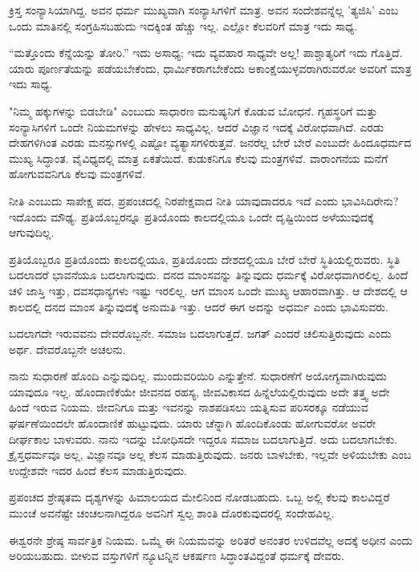 ಕ್ರಿಸ್ತ ಸಂನ್ಯಾಸಿಯಾಗಿದ್ದ. ಅವನ ಧರ್ಮ ಮುಖ್ಯವಾಗಿ ಸಂನ್ಯಾಸಿಗಳಿಗೆ ಮಾತ್ರ. ಅವನ ಸಂದೇಶವನ್ನೆಲ್ಲ 'ತ್ಯಜಿಸಿ' ಎಂಬ ಒಂದು ಮಾತಿನಲ್ಲಿ ಸಂಗ್ರಹಿಸಬಹುದು ಇದಕ್ಕಿಂತ ಹೆಚ್ಚು ಇಲ್ಲ. ಎಲ್ಲೋ ಕೆಲವರಿಗೆ ಮಾತ್ರ ಇದು ಸಾಧ್ಯ.

“ಮತ್ತೊಂದು ಕೆನ್ನೆಯನ್ನು ತೋರಿ.” ಇದು ಅಸಾಧ್ಯ; ಇದು ವ್ಯವಹಾರ ಸಾಧ್ಯವೇ ಅಲ್ಲ! ಪಾಶ್ಚಾತ್ಯರಿಗೆ ಇದು ಗೊತ್ತಿದೆ. ಯಾರು ಪೂರ್ಣತೆಯನ್ನು ಪಡೆಯಬೇಕೆಂದು, ಧಾರ್ಮಿಕರಾಗಬೇಕೆಂದು ಅಕಾಂಕ್ಷೆಯುಳ್ಳವರಾಗಿರುವರೋ ಅವರಿಗೆ ಮಾತ್ರ ಇದು ಸಾಧ್ಯ.

"ನಿಮ್ಮ ಹಕ್ಕುಗಳನ್ನು ಬಿಡಬೇಡಿ" ಎಂಬುದು ಸಾಧಾರಣ ಮನುಷ್ಯನಿಗೆ ಕೊಡುವ ಬೋಧನೆ. ಗೃಹಸ್ಥರಿಗೆ ಮತ್ತು ಸಂನ್ಯಾಸಿಗಳಿಗೆ ಒಂದೇ ನಿಯಮಗಳನ್ನು ಹೇಳಲು ಸಾಧ್ಯವಿಲ್ಲ. ಆದರೆ ವಿಜ್ಞಾನ ಇದಕ್ಕೆ ವಿರೋಧವಾಗಿದೆ. ಎರಡು ದೇಹಗಳಿಗಿಂತ ಎರಡು ಮನಸ್ಸುಗಳಲ್ಲಿ ಎಷ್ಟೋ ವ್ಯತ್ಯಾಸಗಳಿರುತ್ತವೆ. ಜನರೆಲ್ಲ ಬೇರೆ ಬೇರೆ ಎಂಬುದೇ ಹಿಂದೂಧರ್ಮದ ಮುಖ್ಯ ಸಿದ್ಧಾಂತ. ವೈವಿಧ್ಯದಲ್ಲಿ ಮಾತ್ರ ಏಕತೆಯಿದೆ. ಕುಡುಕನಿಗೂ ಕೆಲವು ಮಂತ್ರಗಳಿವೆ. ವಾರಾಂಗನೆಯ ಮನೆಗೆ ಹೋಗುವವನಿಗೂ ಕೆಲವು ಮಂತ್ರಗಳಿವೆ.

ನೀತಿ ಎಂಬುದು ಸಾಪೇಕ್ಷ ಪದ, ಪ್ರಪಂಚದಲ್ಲಿ ನಿರಪೇಕ್ಷವಾದ ನೀತಿ ಯಾವುದಾದರೂ ಇದೆ ಎಂದು ಭಾವಿಸಿದಿರೇನು? ಇದೊಂದು ಮೌಢ್ಯ. ಪ್ರತಿಯೊಬ್ಬರನ್ನೂ ಪ್ರತಿಯೊಂದು ಕಾಲದಲ್ಲಿಯೂ ಒಂದೇ ದೃಷ್ಟಿಯಿಂದ ಅಳೆಯುವುದಕ್ಕೆ ಆಗುವುದಿಲ್ಲ.

ಪ್ರತಿಯೊಬ್ಬರೂ ಪ್ರತಿಯೊಂದು ಕಾಲದಲ್ಲಿಯೂ, ಪ್ರತಿಯೊಂದು ದೇಶದಲ್ಲಿಯೂ ಬೇರೆ ಬೇರೆ ಸ್ಥಿತಿಯಲ್ಲಿರುವರು. ಸ್ಥಿತಿ ಬದಲಾದರೆ ಭಾವನೆಯೂ ಬದಲಾಗುವುದು. ದನದ ಮಾಂಸವನ್ನು ತಿನ್ನುವುದು ಧರ್ಮಕ್ಕೆ ವಿರೋಧವಾಗಿರಲಿಲ್ಲ. ಹಿಂದೆ ಚಳಿ ಜಾಸ್ತಿ ಇತ್ತು, ದವಸಧಾನ್ಯಗಳು ಇಷ್ಟು ಇರಲಿಲ್ಲ. ಆಗ ಮಾಂಸ ಒಂದೇ ಮುಖ್ಯ ಆಹಾರವಾಗಿತ್ತು. ಆ ದೇಶದಲ್ಲಿ ಆ ಕಾಲದಲ್ಲಿ ದನದ ಮಾಂಸ ತಿನ್ನುವುದಕ್ಕೆ ಅನುಮತಿ ಇತ್ತು. ಆದರೆ ಈಗ ಅದನ್ನು ಅಧರ್ಮ ಎಂದು ಭಾವಿಸುವರು.

ಬದಲಾಗದೇ ಇರುವವನು ದೇವರೊಬ್ಬನೇ. ಸಮಾಜ ಬದಲಾಗುತ್ತದೆ. ಜಗತ್ ಎಂದರೆ ಚಲಿಸುತ್ತಿರುವುದು ಎಂದು ಅರ್ಥ. ದೇವರೊಬ್ಬನೇ ಅಚಲನು.

ನಾನು ಸುಧಾರಣೆ ಹೊಂದಿ ಎನ್ನುವುದಿಲ್ಲ. ಮುಂದುವರಿಯಿರಿ ಎನ್ನುತ್ತೇನೆ. ಸುಧಾರಣೆಗೆ ಅಯೋಗ್ಯವಾಗಿರುವುದು ಯಾವುದೂ ಇಲ್ಲ. ಹೊಂದಾಣಿಕೆಯೇ ಜೀವನದ ರಹಸ್ಯ, ಜೀವವಿಕಾಸದ ಹಿನ್ನೆಲೆಯಲ್ಲಿರುವುದು ಅದೇ ತತ್ತ್ವ ಅದೇ ಹಿಂದೆ ಇರುವ ನಿಯಮ. ಜೀವನಿಗೂ ಮತ್ತು ಇವನನ್ನು ನಾಶಪಡಿಸಲು ಯತ್ನಿಸುವ ಪರಿಸರಕ್ಕೂ ನಡೆಯುವ ಘರ್ಷಣೆಯಿಂದಲೇ ಹೊಂದಾಣಿಕೆ ಹುಟ್ಟುವುದು. ಯಾರು ಚೆನ್ನಾಗಿ ಹೊಂದಿಕೊಂಡು ಹೋಗುವರೋ ಅವರೇ ದೀರ್ಘಕಾಲ ಬಾಳುವರು. ನಾನು ಇದನ್ನು ಬೋಧಿಸದೇ ಇದ್ದರೂ ಸಮಾಜ ಬದಲಾಗುತ್ತಿದೆ. ಅದು ಬದಲಾಗಬೇಕು. ಕ್ರೈಸ್ತಧರ್ಮವೂ ಅಲ್ಲ, ವಿಜ್ಞಾನವೂ ಅಲ್ಲ ಕೆಲಸ ಮಾಡುತ್ತಿರುವುದು. ಜನರು ಬಾಳಬೇಕು, ಇಲ್ಲವೇ ಅಳಿಯಬೇಕು ಎಂಬ ಉದ್ದೇಶವೇ ಇದರ ಹಿಂದೆ ಕೆಲಸ ಮಾಡುತ್ತಿರುವುದು.

ಪ್ರಪಂಚದ ಶ್ರೇಷ್ಠತಮ ದೃಶ್ಯಗಳನ್ನು ಹಿಮಾಲಯದ ಮೇಲಿನಿಂದ ನೋಡಬಹುದು. ಒಬ್ಬ ಅಲ್ಲಿ ಕೆಲವು ಕಾಲವಿದ್ದರೆ ಮುಂಚೆ ಅವನೆಷ್ಟೇ ಚಂಚಲನಾಗಿದ್ದರೂ ಅವನಿಗೆ ಸ್ವಲ್ಪ ಶಾಂತಿ ದೊರಕುವುದರಲ್ಲಿ ಸಂದೇಹವಿಲ್ಲ.

ಈಶ್ವರನೇ ಶ್ರೇಷ್ಠ ಸಾರ್ವತ್ರಿಕ ನಿಯಮ. ಒಮ್ಮೆ ಈ ನಿಯಮವನ್ನು ಅರಿತರೆ ಅನಂತರ ಉಳಿದವೆಲ್ಲ ಅದಕ್ಕೆ ಅಧೀನ ಎಂದು ಅರಿಯಬಹುದು. ಬೀಳುವ ವಸ್ತುಗಳಿಗೆ ನ್ಯೂಟನ್ನಿನ ಆಕರ್ಷಣ ಸಿದ್ಧಾಂತವಿದ್ದಂತೆ ಧರ್ಮಕ್ಕೆ ದೇವರು.

